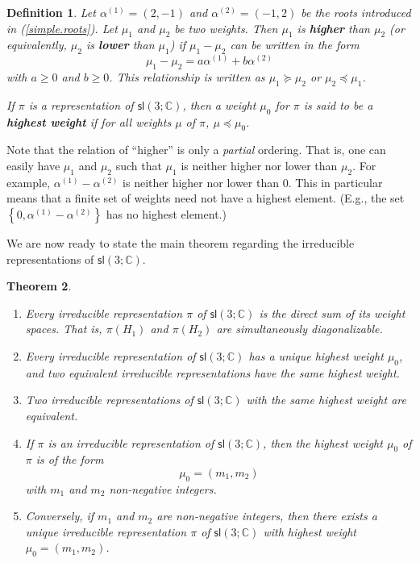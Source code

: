 \documentclass[12pt]{amsbook}
\theoremstyle{plain}
\newtheorem{theorem}{Theorem}
\newtheorem{definition}[theorem]{Definition}
\numberwithin{equation}{chapter}
\numberwithin{theorem}{chapter}
\begin{document}
\begin{definition}
Let $\alpha^{(1)}=(2,-1)$ and $\alpha^{(2)}=(-1,2)$ be the roots introduced in
(\ref{simple.roots}). Let $\mu_{1}$ and $\mu_{2}$ be two weights. Then
$\mu_{1}$ is \textbf{higher} than $\mu_{2}$ (or equivalently, $\mu_{2}$ is
\textbf{lower} than $\mu_{1}$) if $\mu_{1}-\mu_{2}$ can be written in the
form
\[
\mu_{1}-\mu_{2}=a\alpha^{(1)}+b\alpha^{(2)}%
\]
with $a\geq0$ and $b\geq0$. This relationship is written as $\mu_{1}\succeq
\mu_{2}$ or $\mu_{2}\preceq\mu_{1}$.

If $\pi$ is a representation of $\mathsf{sl}\left(  3;\mathbb{C}\right)  $,
then a weight $\mu_{0}$ for $\pi$ is said to be a \textbf{highest weight} if
for all weights $\mu$ of $\pi$, $\mu\preceq\mu_{0}$.
\end{definition}

Note that the relation of ``higher'' is only a \textit{partial} ordering. That
is, one can easily have $\mu_{1}$ and $\mu_{2}$ such that $\mu_{1}$ is neither
higher nor lower than $\mu_{2}$. For example, $\alpha^{(1)}-\alpha^{(2)}$ is
neither higher nor lower than $0$. This in particular means that a finite set
of weights need not have a highest element. (E.g., the set $\left\{
0,\alpha^{(1)}-\alpha^{(2)}\right\}  $ has no highest element.)

We are now ready to state the main theorem regarding the irreducible
representations of $\mathsf{sl}\left(  3;\mathbb{C}\right)  $.

\begin{theorem}
\begin{enumerate}
\item \label{classify.sl3}Every irreducible representation $\pi$ of
$\mathsf{sl}\left(  3;\mathbb{C}\right)  $ is the direct sum of its weight
spaces. That is, $\pi(H_{1})$ and $\pi(H_{2})$ are simultaneously diagonalizable.

\item  Every irreducible representation of $\mathsf{sl}\left(  3;\mathbb{C}%
\right)  $ has a unique highest weight $\mu_{0}$, and two equivalent
irreducible representations have the same highest weight.

\item  Two irreducible representations of $\mathsf{sl}\left(  3;\mathbb{C}%
\right)  $ with the same highest weight are equivalent.

\item  If $\pi$ is an irreducible representation of $\mathsf{sl}\left(
3;\mathbb{C}\right)  $, then the highest weight $\mu_{0}$ of $\pi$ is of the
form
\[
\mu_{0}=(m_{1},m_{2})
\]
with $m_{1}$ and $m_{2}$ non-negative integers.

\item  Conversely, if $m_{1}$ and $m_{2}$ are non-negative integers, then
there exists a unique irreducible representation $\pi$ of $\mathsf{sl}\left(
3;\mathbb{C}\right)  $ with highest weight $\mu_{0}=(m_{1},m_{2})$.
\end{enumerate}
\end{theorem}
\end{document}
